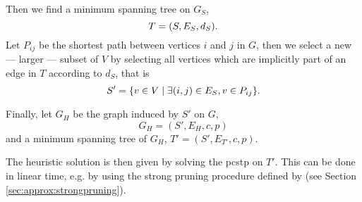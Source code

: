  Then we find a minimum spanning tree on $G_S$,
 $$T = (S, E_S, d_S) \mathnormal{.}$$
 Let $P_{ij}$ be the shortest path between vertices $i$ and $j$ in $G$, then
 we select a new --- larger --- subset of $V$ by selecting all vertices which
 are implicitly part of an edge in $T$ according to $d_S$, that is
 $$S' = \{ v \in V \mid \exists (i,j) \in E_S, v \in P_{ij}\}\mathnormal{.}$$

 Finally, let $G_H$ be the graph induced by $S'$ on $G$,
 $$G_H = (S', E_H, c, p)$$
 and a minimum spanning tree of $G_H$, $T' = (S', E_{T'}, c, p)$.

 The heuristic solution is then given by solving the \gls{pcstp}
 on $T'$. This can be done in linear time, e.g. by using the
 strong pruning procedure defined by
 \citet{Johnson:2000:PCS:338219.338637}
 (see Section \ref{sec:approx:strongpruning}).

 
 
 

